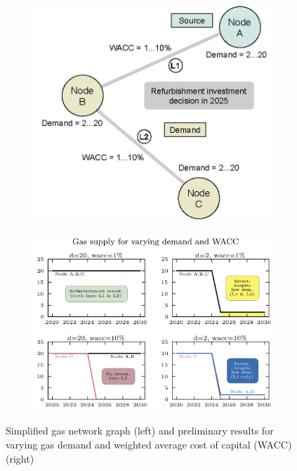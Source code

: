 \documentclass[review]{elsarticle}
\begin{document}
\begin{figure}[h]
	\begin{subfigure}[c]{0.3975\textwidth}
		\centering
		\includegraphics[width=1\linewidth]{FigA.jpg}
		\label{fig:a}
	\end{subfigure}
	\begin{subfigure}[c]{0.49\textwidth}
		\centering
		\includegraphics[width=1\linewidth]{FigB.png}
		\label{fig:tenant}
	\end{subfigure}
	\caption{Simplified gas network graph (left) and preliminary results for varying gas demand and weighted average cost of capital (WACC) (right)}
	\label{fig:b}
\end{figure}

{\footnotesize
	
}
\end{document}
